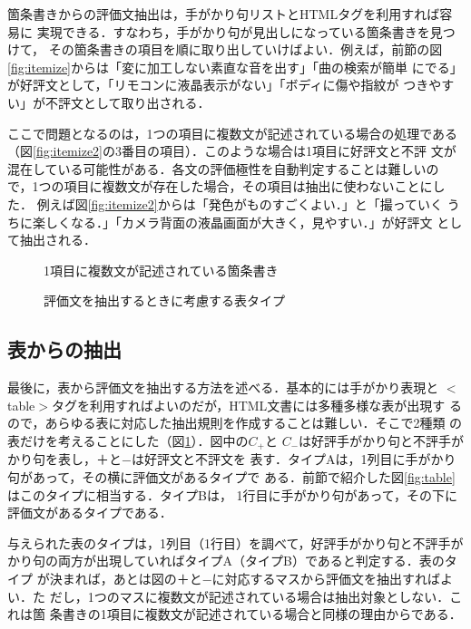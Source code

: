 \documentclass[japanese]{jnlp_1.4}
\begin{document}
箇条書きからの評価文抽出は，手がかり句リストとHTMLタグを利用すれば容易に
実現できる．すなわち，手がかり句が見出しになっている箇条書きを見つけて，
その箇条書きの項目を順に取り出していけばよい．例えば，前節の図
\ref{fig:itemize}からは「変に加工しない素直な音を出す」「曲の検索が簡単
にでる」が好評文として，「リモコンに液晶表示がない」「ボディに傷や指紋が
つきやすい」が不評文として取り出される．

ここで問題となるのは，1つの項目に複数文が記述されている場合の処理である
（図\ref{fig:itemize2}の3番目の項目）．このような場合は1項目に好評文と不評
文が混在している可能性がある．各文の評価極性を自動判定することは難しいの
で，1つの項目に複数文が存在した場合，その項目は抽出に使わないことにした．
例えば図\ref{fig:itemize2}からは「発色がものすごくよい．」と「撮っていく
うちに楽しくなる．」「カメラ背面の液晶画面が大きく，見やすい．」が好評文
として抽出される．

\begin{figure}[b]
\begin{minipage}[b]{200pt}

  \caption{1項目に複数文が記述されている箇条書き}
  \label{fig:itemize2}
\end{minipage}
\hfill
\begin{minipage}[b]{200pt}

   \caption{評価文を抽出するときに考慮する表タイプ}
  \label{fig:table_pattern}
\end{minipage}
\end{figure}


\subsection{表からの抽出}

最後に，表から評価文を抽出する方法を述べる．基本的には手がかり表現と
$<$table$>$タグを利用すればよいのだが，HTML文書には多種多様な表が出現す
るので，あらゆる表に対応した抽出規則を作成することは難しい．そこで2種類
の表だけを考えることにした（図\ref{fig:table_pattern}）．図中の$C_{+}$と
$C_{-}$は好評手がかり句と不評手がかり句を表し，＋と−は好評文と不評文を
表す．タイプAは，1列目に手がかり句があって，その横に評価文があるタイプで
ある．前節で紹介した図\ref{fig:table}はこのタイプに相当する．タイプBは，
1行目に手がかり句があって，その下に評価文があるタイプである．



与えられた表のタイプは，1列目（1行目）を調べて，好評手がかり句と不評手が
かり句の両方が出現していればタイプA（タイプB）であると判定する．表のタイプ
が決まれば，あとは図の＋と−に対応するマスから評価文を抽出すればよい．た
だし，1つのマスに複数文が記述されている場合は抽出対象としない．これは箇
条書きの1項目に複数文が記述されている場合と同様の理由からである．
\end{document}
